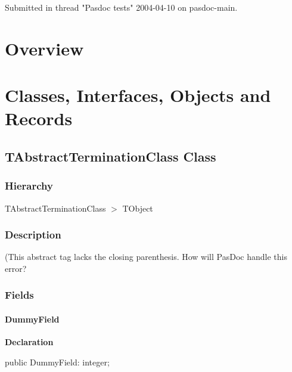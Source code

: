 \documentclass{report}
\begin{document}
Submitted in thread "Pasdoc tests" 2004{-}04{-}10 on pasdoc{-}main.
\section{Overview}
\begin{description}
\item[\texttt{\begin{ttfamily}TAbstractTerminationClass\end{ttfamily} Class}]
\end{description}
\section{Classes, Interfaces, Objects and Records}
\subsection*{TAbstractTerminationClass Class}
\subsubsection*{\large{\textbf{Hierarchy}}\normalsize\hspace{1ex}\hfill}
TAbstractTerminationClass {$>$} TObject
\subsubsection*{\large{\textbf{Description}}\normalsize\hspace{1ex}\hfill}
(This abstract tag lacks the closing parenthesis. How will PasDoc handle this error?\subsubsection*{\large{\textbf{Fields}}\normalsize\hspace{1ex}\hfill}
\paragraph*{DummyField}\hspace*{\fill}

\begin{list}{}{
\setlength{\itemindent}{0cm}
\setlength{\listparindent}{0cm}
\setlength{\leftmargin}{\evensidemargin}
\addtolength{\leftmargin}{\tmplength}
\settowidth{\labelsep}{X}
\addtolength{\leftmargin}{\labelsep}
\setlength{\labelwidth}{\tmplength}
}
\begin{flushleft}
\item[\textbf{Declaration}\hfill]
\begin{ttfamily}
public DummyField: integer;\end{ttfamily}


\end{flushleft}
\end{list}
\end{document}
